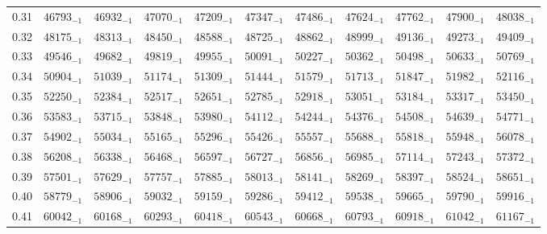 \documentclass[10pt, a4paper]{article}
\begin{document}
\begin{center}
\begin{longtable}{c | c c c c c | c c c c c}
        0.31 & \({46793}_{-1}\) & \({46932}_{-1}\) & \({47070}_{-1}\) & \({47209}_{-1}\) & \({47347}_{-1}\) & \({47486}_{-1}\) & \({47624}_{-1}\) & \({47762}_{-1}\) & \({47900}_{-1}\) & \({48038}_{-1}\)\\
        0.32 & \({48175}_{-1}\) & \({48313}_{-1}\) & \({48450}_{-1}\) & \({48588}_{-1}\) & \({48725}_{-1}\) & \({48862}_{-1}\) & \({48999}_{-1}\) & \({49136}_{-1}\) & \({49273}_{-1}\) & \({49409}_{-1}\)\\
        0.33 & \({49546}_{-1}\) & \({49682}_{-1}\) & \({49819}_{-1}\) & \({49955}_{-1}\) & \({50091}_{-1}\) & \({50227}_{-1}\) & \({50362}_{-1}\) & \({50498}_{-1}\) & \({50633}_{-1}\) & \({50769}_{-1}\)\\
        0.34 & \({50904}_{-1}\) & \({51039}_{-1}\) & \({51174}_{-1}\) & \({51309}_{-1}\) & \({51444}_{-1}\) & \({51579}_{-1}\) & \({51713}_{-1}\) & \({51847}_{-1}\) & \({51982}_{-1}\) & \({52116}_{-1}\)\\
        0.35 & \({52250}_{-1}\) & \({52384}_{-1}\) & \({52517}_{-1}\) & \({52651}_{-1}\) & \({52785}_{-1}\) & \({52918}_{-1}\) & \({53051}_{-1}\) & \({53184}_{-1}\) & \({53317}_{-1}\) & \({53450}_{-1}\)\\
        0.36 & \({53583}_{-1}\) & \({53715}_{-1}\) & \({53848}_{-1}\) & \({53980}_{-1}\) & \({54112}_{-1}\) & \({54244}_{-1}\) & \({54376}_{-1}\) & \({54508}_{-1}\) & \({54639}_{-1}\) & \({54771}_{-1}\)\\
        0.37 & \({54902}_{-1}\) & \({55034}_{-1}\) & \({55165}_{-1}\) & \({55296}_{-1}\) & \({55426}_{-1}\) & \({55557}_{-1}\) & \({55688}_{-1}\) & \({55818}_{-1}\) & \({55948}_{-1}\) & \({56078}_{-1}\)\\
        0.38 & \({56208}_{-1}\) & \({56338}_{-1}\) & \({56468}_{-1}\) & \({56597}_{-1}\) & \({56727}_{-1}\) & \({56856}_{-1}\) & \({56985}_{-1}\) & \({57114}_{-1}\) & \({57243}_{-1}\) & \({57372}_{-1}\)\\
        0.39 & \({57501}_{-1}\) & \({57629}_{-1}\) & \({57757}_{-1}\) & \({57885}_{-1}\) & \({58013}_{-1}\) & \({58141}_{-1}\) & \({58269}_{-1}\) & \({58397}_{-1}\) & \({58524}_{-1}\) & \({58651}_{-1}\)\\
        0.40 & \({58779}_{-1}\) & \({58906}_{-1}\) & \({59032}_{-1}\) & \({59159}_{-1}\) & \({59286}_{-1}\) & \({59412}_{-1}\) & \({59538}_{-1}\) & \({59665}_{-1}\) & \({59790}_{-1}\) & \({59916}_{-1}\)\\
        0.41 & \({60042}_{-1}\) & \({60168}_{-1}\) & \({60293}_{-1}\) & \({60418}_{-1}\) & \({60543}_{-1}\) & \({60668}_{-1}\) & \({60793}_{-1}\) & \({60918}_{-1}\) & \({61042}_{-1}\) & \({61167}_{-1}\)\\

\end{longtable}
\end{center}
\end{document}

